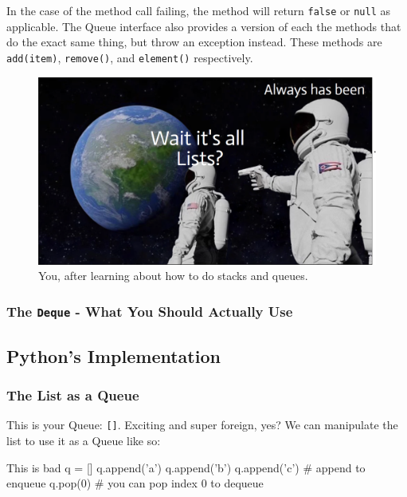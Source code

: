 In the case of the method call failing, the method will return \texttt{false} or \texttt{null} as applicable.  The Queue interface also provides a version of each the methods that do the exact same thing, but throw an exception instead.  These methods are \texttt{add(item)}, \texttt{remove()}, and \texttt{element()} respectively. 



\begin{figure}
	\centering
	\includegraphics[width=\linewidth]{pics/waitQueuesAreLists}
	\caption{You, after learning about how to do stacks and queues.}
	\label{fig:waitqueuesarelists}
\end{figure}

\subsubsection{The \texttt{Deque} - What You Should Actually Use}

\subsection{Python's Implementation}


\subsubsection{The List as a Queue}

This is your Queue: \texttt{[]}.  Exciting and super foreign, yes?
We can manipulate the list to use it as a Queue like so:

\begin{pycode}{This is bad}
q = []
q.append('a')
q.append('b')
q.append('c') # append to enqueue
q.pop(0)      # you can pop index 0 to dequeue
\end{pycode}

